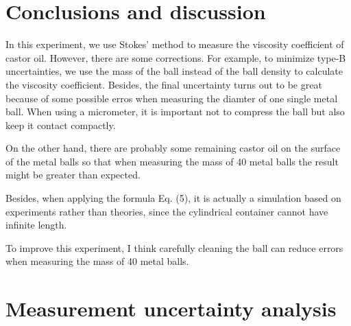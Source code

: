\documentclass[a4paper]{report}
\begin{document}
	\section{Conclusions and discussion}
	In this experiment, we use Stokes' method to measure the viscosity coefficient of castor oil. However, there are some corrections. For example, to minimize type-B uncertainties, we use the mass of the ball instead of the ball density to calculate the viscosity coefficient. Besides, the final uncertainty turns out to be great because of some possible erros when measuring the diamter of one single metal ball. When using a micrometer, it is important not to compress the ball but also keep it contact compactly.
	
	On the other hand, there are probably some remaining castor oil on the surface of the metal balls so that when measuring the mass of 40 metal balls the result might be greater than expected.
	
	Besides, when applying the formula Eq. (5), it is actually a simulation based on experiments rather than theories, since the cylindrical container cannot have infinite length.
	
	To improve this experiment, I think carefully cleaning the ball can reduce errors when measuring the mass of 40 metal balls.
	\newpage
	\renewcommand\thesection{\Alph{section}}
	\setcounter{section}{0}
	\section{Measurement uncertainty analysis}
\end{document}
